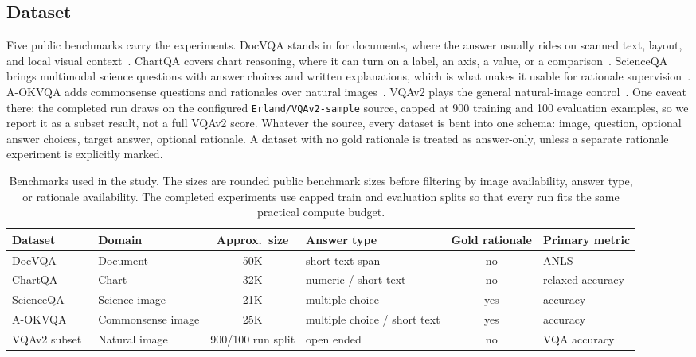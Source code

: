 \documentclass[preprint,12pt]{elsarticle}
\begin{document}
\subsection{Dataset}
Five public benchmarks carry the experiments.
DocVQA stands in for documents, where the answer usually rides on scanned text, layout, and local visual context~\cite{mathew2021docvqa}.
ChartQA covers chart reasoning, where it can turn on a label, an axis, a value, or a comparison~\cite{masry2022chartqa}.
ScienceQA brings multimodal science questions with answer choices and written explanations, which is what makes it usable for rationale supervision~\cite{lu2022scienceqa}.
A-OKVQA adds commonsense questions and rationales over natural images~\cite{schwenk2022aokvqa}.
VQAv2 plays the general natural-image control~\cite{goyal2017vqav2}.
One caveat there: the completed run draws on the configured \texttt{Erland/VQAv2-sample} source, capped at 900 training and 100 evaluation examples, so we report it as a subset result, not a full VQAv2 score.
Whatever the source, every dataset is bent into one schema: image, question, optional answer choices, target answer, optional rationale.
A dataset with no gold rationale is treated as answer-only, unless a separate rationale experiment is explicitly marked.

\begin{table}[!ht]
\centering
\caption{Benchmarks used in the study. The sizes are rounded public benchmark sizes before filtering by image availability, answer type, or rationale availability. The completed experiments use capped train and evaluation splits so that every run fits the same practical compute budget.}
\label{tab:Datasets}
\begin{adjustbox}{max width=\textwidth}
\begin{tabular}{|l|l|c|l|c|l|}
\hline
\textbf{Dataset} & \textbf{Domain} & \textbf{Approx.\ size} & \textbf{Answer type} & \textbf{Gold rationale} & \textbf{Primary metric} \\ \hline
DocVQA~\cite{mathew2021docvqa} & Document & 50K & short text span & no & ANLS \\
ChartQA~\cite{masry2022chartqa} & Chart & 32K & numeric / short text & no & relaxed accuracy \\
ScienceQA~\cite{lu2022scienceqa} & Science image & 21K & multiple choice & yes & accuracy \\
A-OKVQA~\cite{schwenk2022aokvqa} & Commonsense image & 25K & multiple choice / short text & yes & accuracy \\
VQAv2 subset~\cite{goyal2017vqav2} & Natural image & 900/100 run split & open ended & no & VQA accuracy \\ \hline
\end{tabular}
\end{adjustbox}
\end{table}
\end{document}
